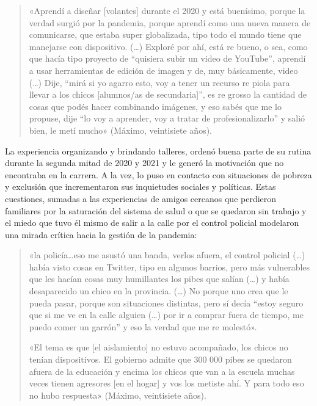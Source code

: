 \begin{quote}
«Aprendí a diseñar {[}volantes{]} durante el 2020 y está buenísimo, porque la verdad surgió por la pandemia, porque aprendí como una nueva manera de comunicarse, que estaba super globalizada, tipo todo el mundo tiene que manejarse con dispositivo. (\ldots) Exploré por ahí, está re bueno, o sea, como que hacía tipo proyecto de ``quisiera subir un video de YouTube'', aprendí a usar herramientas de edición de imagen y de, muy básicamente, video (\ldots) Dije, ``mirá si yo agarro esto, voy a tener un recurso re piola para llevar a los chicos {[}alumnos/as de secundaria{]}'', es re grosso la cantidad de cosas que podés hacer combinando imágenes, y eso sabés que me lo propuse, dije ``lo voy a aprender, voy a tratar de profesionalizarlo'' y salió bien, le metí mucho» (Máximo, veintisiete años).
\end{quote}

La experiencia organizando y brindando talleres, ordenó buena parte de su rutina durante la segunda mitad de 2020 y 2021 y le generó la motivación que no encontraba en la carrera. A la vez, lo puso en contacto con situaciones de pobreza y exclusión que incrementaron sus inquietudes sociales y políticas. Estas cuestiones, sumadas a las experiencias de amigos cercanos que perdieron familiares por la saturación del sistema de salud o que se quedaron sin trabajo y el miedo que tuvo él mismo de salir a la calle por el control policial modelaron una mirada crítica hacia la gestión de la pandemia:

\begin{quote}
«la policía\ldots eso me asustó una banda, verlos afuera, el control policial (\ldots) había visto cosas en Twitter, tipo en algunos barrios, pero más vulnerables que les hacían cosas muy humillantes los pibes que salían (\ldots) y había desaparecido un chico en la provincia. (\ldots) No porque uno crea que le pueda pasar, porque son situaciones distintas, pero sí decía ``estoy seguro que si me ve en la calle alguien (\ldots) por ir a comprar fuera de tiempo, me puedo comer un garrón'' y eso la verdad que me re molestó».

«El tema es que {[}el aislamiento{]} no estuvo acompañado, los chicos no tenían dispositivos. El gobierno admite que 300 000 pibes se quedaron afuera de la educación y encima los chicos que van a la escuela muchas veces tienen agresores {[}en el hogar{]} y vos los metiste ahí. Y para todo eso no hubo respuesta» (Máximo, veintisiete años).
\end{quote}

